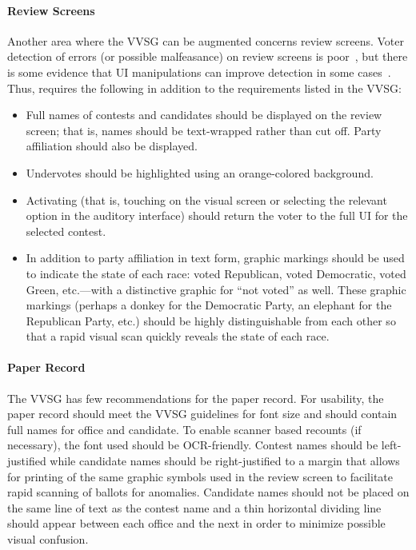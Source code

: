 \paragraph{Review Screens}
Another area where the VVSG can be augmented concerns review screens. Voter detection of errors (or possible malfeasance) on review screens is poor~\cite{everett07thesis}, but there is some evidence that UI manipulations can improve detection in some cases~\cite{campbell-evt09}. Thus, \projname  requires the following in addition to the requirements listed in the VVSG:
\begin{itemize}
\item  Full names of contests and candidates should be displayed on the review screen; that is, names should be text-wrapped rather than cut off. Party affiliation should also be displayed.
\item Undervotes should be highlighted using an orange-colored background. 
\item Activating (that is, touching on the visual screen or selecting the relevant option in the auditory interface) should return the voter to the full UI for the selected contest.
\item In addition to party affiliation in text form, graphic markings should be used to indicate the state of each race: voted Republican, voted Democratic, voted Green, etc.---with a distinctive graphic for ``not voted'' as well. These graphic markings (perhaps a donkey for the Democratic Party, an elephant for the Republican Party, etc.) should be highly distinguishable from each other so that a rapid visual scan quickly reveals the state of each race.
\end{itemize}

\paragraph{Paper Record}
The VVSG has few recommendations for the paper record. For usability, the paper record should meet the VVSG guidelines for font size and should contain full names for office and candidate. To enable scanner based recounts (if necessary), the font used should be OCR-friendly. Contest names should be left-justified while candidate names should be right-justified to a margin that allows for printing of the same graphic symbols used in the review screen to facilitate rapid scanning of ballots for anomalies. Candidate names should not be placed on the same line of text as the contest name and a thin horizontal dividing line should appear between each office and the next in order to minimize possible visual confusion.

